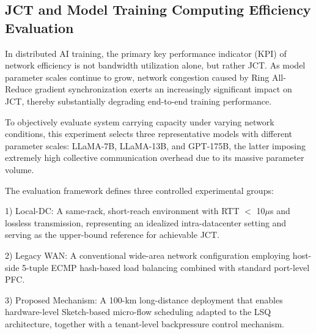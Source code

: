 \documentclass[a4paper]{jpconf}
\begin{document}
\subsection{JCT and Model Training Computing Efficiency Evaluation}


In distributed AI training, the primary key performance indicator (KPI) of network efficiency is not bandwidth utilization alone, but rather JCT. As model parameter scales continue to grow, network congestion caused by Ring All-Reduce gradient synchronization exerts an increasingly significant impact on JCT, thereby substantially degrading end-to-end training performance.


To objectively evaluate system carrying capacity under varying network conditions, this experiment selects three representative models with different parameter scales: LLaMA-7B, LLaMA-13B, and GPT-175B, the latter imposing extremely high collective communication overhead due to its massive parameter volume.


The evaluation framework defines three controlled experimental groups:


1) Local-DC: A same-rack, short-reach environment with RTT $<$ 10$\mu$s and lossless transmission, representing an idealized intra-datacenter setting and serving as the upper-bound reference for achievable JCT.


2) Legacy WAN: A conventional wide-area network configuration employing host-side 5-tuple ECMP hash-based load balancing combined with standard port-level PFC.


3) Proposed Mechanism: A 100-km long-distance deployment that enables hardware-level Sketch-based micro-flow scheduling adapted to the LSQ architecture, together with a tenant-level backpressure control mechanism.
\end{document}
